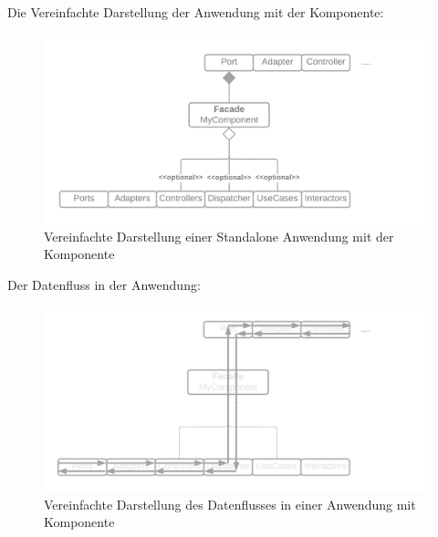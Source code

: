 \newpage
Die Vereinfachte Darstellung der Anwendung mit der Komponente:
\begin{figure}[H]
    \centering
    \includegraphics[width=1\textwidth]{./images/Architecture as Component.png}
    \caption{Vereinfachte Darstellung einer Standalone Anwendung mit der Komponente}
    \label{fig:SimpliedArchitectureAsStandaloneWithComponent}
\end{figure}

Der Datenfluss in der Anwendung:
\begin{figure}[H]
    \centering
    \includegraphics[width=1\textwidth]{./images/Dataflow as Component with inform.png}
    \caption{Vereinfachte Darstellung des Datenflusses in einer Anwendung mit Komponente}
    \label{fig:SimpliedDataflowWithComponent}
\end{figure}